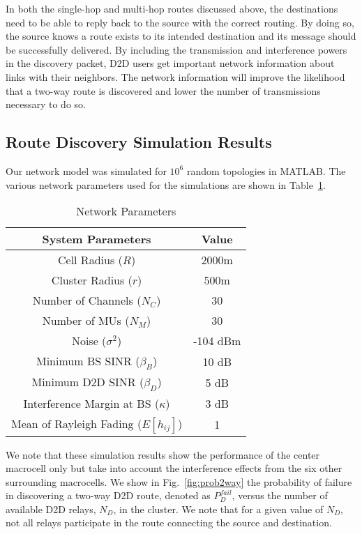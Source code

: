 \documentclass[10pt, final, journal, letterpaper,oneside, twocolumn]{IEEEtran}
\begin{document}
In both the single-hop and multi-hop routes discussed above, the destinations need to be able to reply back to the source with the correct routing.  By doing so, the source knows a route exists to its intended destination and its message should be successfully delivered.  By including the transmission and interference powers in the discovery packet, D2D users get important network information about links with their neighbors.  The network information will improve the likelihood that a two-way route is discovered and lower the number of transmissions necessary to do so.  







\subsection{Route Discovery Simulation Results}
Our network model was simulated for $10^6$ random topologies in MATLAB. The various network parameters used for the simulations are shown in Table~\ref{table:vars}.  
\begin{table}[htp]
\begin{center}  
\caption{Network Parameters} 
\centering 
\begin{tabular}{|c||c|} 
\hline   
\textbf{System Parameters} & \textbf{Value} \\   
\hline\hline 
Cell Radius ($R$) & 2000m\\
\hline
Cluster Radius ($r$) & 500m \\
\hline
Number of Channels ($N_C$)& 30 \\ 
\hline
Number of MUs ($N_M$)& 30 \\ 
\hline
Noise ($\sigma^2$)& -104 dBm  \\ 
\hline
Minimum BS SINR ($\beta_{B}$)& 10 dB  \\
\hline  
Minimum D2D SINR  ($\beta_D$)& 5 dB  \\ 
\hline
Interference Margin at BS ($\kappa$)& 3 dB  \\
\hline
Mean of Rayleigh Fading ($E[h_{ij}]$)& 1\\
\hline
\end{tabular} 
\label{table:vars}  
\end{center}
\end{table}
We note that these simulation results show the performance of the center macrocell only but take into account the interference effects from the six other surrounding macrocells.  We show in Fig.~\ref{fig:prob2way} the probability of failure in discovering a two-way D2D route, denoted as $P^{fail}_{D}$, versus the number of available D2D relays, $N_D$, in the cluster.  We note that for a given value of $N_D$, not all relays participate in the route connecting the source and destination.
\end{document}
